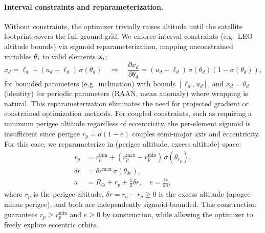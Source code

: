 \paragraph{Interval constraints and reparameterization.} \label{para:interval_constraints}

Without constraints, the optimizer trivially raises altitude until the satellite footprint covers the full ground grid. We enforce interval constraints (e.g.\ LEO altitude bounds) via sigmoid reparameterization, mapping unconstrained variables $\mathbf{\theta}_i$ to valid elements $\mathbf{x}_i$:
\begin{equation}
    x_d = \ell_d + (u_d - \ell_d) \, \sigma(\theta_d) \quad \Rightarrow \quad \frac{\partial x_d}{\partial \theta_d} = (u_d - \ell_d) \, \sigma(\theta_d)(1 - \sigma(\theta_d)),
    \label{eq:reparam}
\end{equation}
for bounded parameters (e.g.\ inclination) with bounds $[\ell_d, u_d]$, and $x_d = \theta_d$ (identity) for periodic parameters (RAAN, mean anomaly) where wrapping is natural.
This reparameterization eliminates the need for projected gradient or constrained optimization methods.
For coupled constraints, such as requiring a minimum perigee altitude regardless of eccentricity, the per-element sigmoid is insufficient since perigee $r_p = a(1-e)$ couples semi-major axis and eccentricity. For this case, we reparameterize in (perigee altitude, excess altitude) space:
\begin{align}
    r_p &= r_p^{\min} + (r_p^{\max} - r_p^{\min})\,\sigma(\theta_{r_p}), \label{eq:reparam_rp} \\
    \delta r &= \delta r^{\max}\,\sigma(\theta_{\delta r}), \label{eq:reparam_dr} \\
    a &= R_\oplus + r_p + \tfrac{1}{2}\delta r, \quad e = \frac{\delta r}{2a}, \label{eq:reparam_ae}
\end{align}
where $r_p$ is the perigee altitude, $\delta r = r_a - r_p \geq 0$ is the excess altitude (apogee minus perigee), and both are independently sigmoid-bounded. This construction guarantees $r_p \geq r_p^{\min}$ and $e \geq 0$ by construction, while allowing the optimizer to freely explore eccentric orbits.

